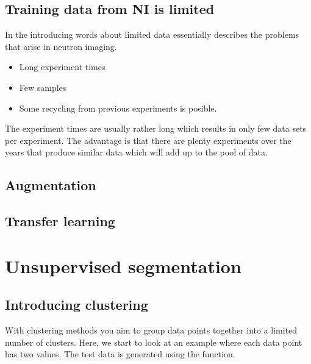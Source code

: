 \documentclass[letterpaper,10pt,english]{sphinxmanual}
\begin{document}
\section{Training data from NI is limited}
\label{\detokenize{ML4NeutronImageSegmentation:training-data-from-ni-is-limited}}
In the introducing words about limited data essentially describes the problems that arise in neutron imaging.
\begin{itemize}
\item {} 
Long experiment times

\item {} 
Few samples

\item {} 
Some recycling from previous experiments is posible.

\end{itemize}

The experiment times are usually rather long which results in only few data sets per experiment. The advantage is that there are plenty experiments over the years that produce similar data which will add up to the pool of data.


\section{Augmentation}
\label{\detokenize{ML4NeutronImageSegmentation:augmentation}}

\section{Transfer learning}
\label{\detokenize{ML4NeutronImageSegmentation:transfer-learning}}

\chapter{Unsupervised segmentation}
\label{\detokenize{ML4NeutronImageSegmentation:unsupervised-segmentation}}

\section{Introducing clustering}
\label{\detokenize{ML4NeutronImageSegmentation:introducing-clustering}}
With clustering methods you aim to group data points together into a limited number of clusters. Here, we start to look at an example where each data point has two values. The test data is generated using the  function.
\end{document}

